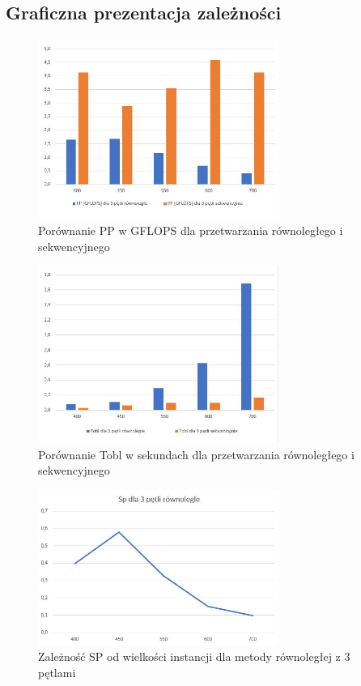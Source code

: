 \documentclass[10pt,a4paper]{article}
\begin{document}
\subsection*{Graficzna prezentacja zależności}
\begin{figure}[h]
	\centering
	\includegraphics[width=0.7\textwidth]{PP.JPG}
	\caption{Porównanie PP w GFLOPS dla przetwarzania równoległego i sekwencyjnego}
\end{figure}

\newpage

\begin{figure}[h]
	\centering
	\includegraphics[width=0.7\textwidth]{Tobl.JPG}
	\caption{Porównanie Tobl w sekundach dla przetwarzania równoległego i sekwencyjnego}
\end{figure}

\begin{figure}[h]
	\centering
	\includegraphics[width=0.7\textwidth]{SP.JPG}
	\caption{Zależność SP od wielkości instancji dla metody równoległej z 3 pętlami}
\end{figure}
\end{document}
